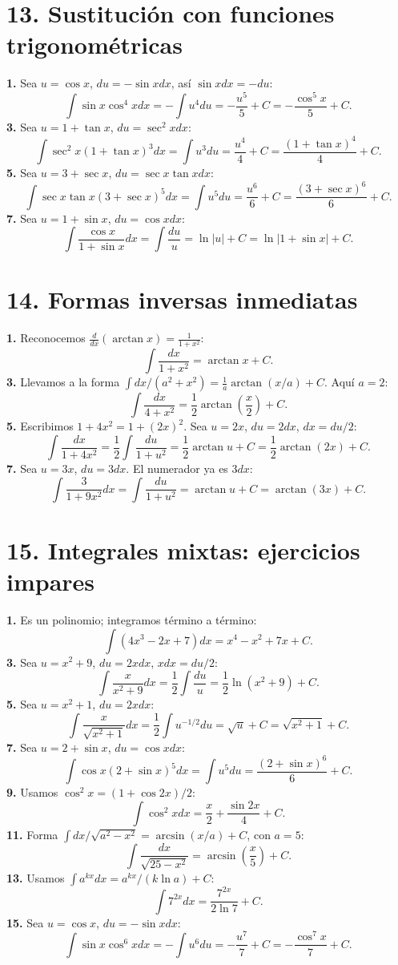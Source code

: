 \documentclass[11pt]{article}
\begin{document}
\section*{13. Sustitución con funciones trigonométricas}
\textbf{1.} Sea $u=\cos x$, $du=-\sin x dx$, así $\sin xdx=-du$:
\[\int\sin x\cos^4x dx=-\int u^4du=-\frac{u^5}{5}+C=-\frac{\cos^5x}{5}+C.\]
\textbf{3.} Sea $u=1+\tan x$, $du=\sec^2x dx$:
\[\int\sec^2x(1+\tan x)^3dx=\int u^3du=\frac{u^4}{4}+C=\frac{(1+\tan x)^4}{4}+C.\]
\textbf{5.} Sea $u=3+\sec x$, $du=\sec x\tan x dx$:
\[\int\sec x\tan x(3+\sec x)^5dx=\int u^5du=\frac{u^6}{6}+C=\frac{(3+\sec x)^6}{6}+C.\]
\textbf{7.} Sea $u=1+\sin x$, $du=\cos xdx$:
\[\int\frac{\cos x}{1+\sin x}dx=\int\frac{du}{u}=\ln|u|+C=\ln|1+\sin x|+C.\]

\section*{14. Formas inversas inmediatas}
\textbf{1.} Reconocemos $\displaystyle\frac{d}{dx}(\arctan x)=\frac1{1+x^2}$:
\[\int\frac{dx}{1+x^2}=\arctan x+C.\]
\textbf{3.} Llevamos a la forma $\int dx/(a^2+x^2)=\frac1a\arctan(x/a)+C$. Aquí $a=2$:
\[\int\frac{dx}{4+x^2}=\frac12\arctan\left(\frac{x}{2}\right)+C.\]
\textbf{5.} Escribimos $1+4x^2=1+(2x)^2$. Sea $u=2x$, $du=2dx$, $dx=du/2$:
\[\int\frac{dx}{1+4x^2}=\frac12\int\frac{du}{1+u^2}=\frac12\arctan u+C=\frac12\arctan(2x)+C.\]
\textbf{7.} Sea $u=3x$, $du=3dx$. El numerador ya es $3dx$:
\[\int\frac{3}{1+9x^2}dx=\int\frac{du}{1+u^2}=\arctan u+C=\arctan(3x)+C.\]

\section*{15. Integrales mixtas: ejercicios impares}
\textbf{1.} Es un polinomio; integramos término a término:
\[\int(4x^3-2x+7)dx=x^4-x^2+7x+C.\]
\textbf{3.} Sea $u=x^2+9$, $du=2x dx$, $x dx=du/2$:
\[\int\frac{x}{x^2+9}dx=\frac12\int\frac{du}{u}=\frac12\ln(x^2+9)+C.\]
\textbf{5.} Sea $u=x^2+1$, $du=2x dx$:
\[\int\frac{x}{\sqrt{x^2+1}}dx=\frac12\int u^{-1/2}du=\sqrt{u}+C=\sqrt{x^2+1}+C.\]
\textbf{7.} Sea $u=2+\sin x$, $du=\cos x dx$:
\[\int\cos x(2+\sin x)^5dx=\int u^5du=\frac{(2+\sin x)^6}{6}+C.\]
\textbf{9.} Usamos $\cos^2x=(1+\cos2x)/2$:
\[\int\cos^2x dx=\frac{x}{2}+\frac{\sin2x}{4}+C.\]
\textbf{11.} Forma $\int dx/\sqrt{a^2-x^2}=\arcsin(x/a)+C$, con $a=5$:
\[\int\frac{dx}{\sqrt{25-x^2}}=\arcsin\left(\frac{x}{5}\right)+C.\]
\textbf{13.} Usamos $\int a^{kx}dx=a^{kx}/(k\ln a)+C$:
\[\int7^{2x}dx=\frac{7^{2x}}{2\ln7}+C.\]
\textbf{15.} Sea $u=\cos x$, $du=-\sin xdx$:
\[\int\sin x\cos^6x dx=-\int u^6du=-\frac{u^7}{7}+C=-\frac{\cos^7x}{7}+C.\]
\end{document}
